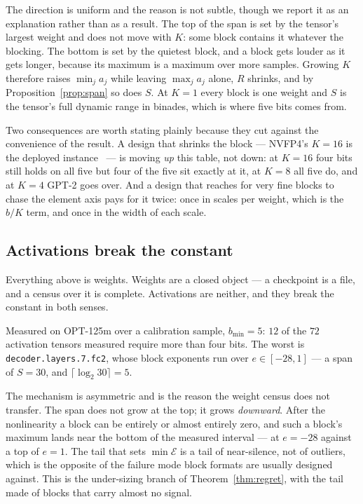 \documentclass[11pt]{article}
\theoremstyle{definition}
\begin{document}
The direction is uniform and the reason is not subtle, though we report it as an
explanation rather than as a result. The top of the span is set by the tensor's
largest weight and does not move with $K$: some block contains it whatever the
blocking. The bottom is set by the quietest block, and a block gets louder as it
gets longer, because its maximum is a maximum over more samples. Growing $K$
therefore raises $\min_j a_j$ while leaving $\max_j a_j$ alone, $R$ shrinks, and
by Proposition~\ref{prop:span} so does $S$. At $K=1$ every block is one weight
and $S$ is the tensor's full dynamic range in binades, which is where five bits
comes from.

Two consequences are worth stating plainly because they cut against the
convenience of the result. A design that shrinks the block --- NVFP4's $K=16$ is
the deployed instance~\cite{nvfp4} --- is moving \emph{up} this table, not down:
at $K=16$ four bits still holds on all five but four of the five sit exactly at
it, at $K=8$ all five do, and at $K=4$ GPT-2 goes over. And a design that reaches
for very fine blocks to chase the element axis pays for it twice: once in scales
per weight, which is the $b/K$ term, and once in the width of each scale.

\subsection{Activations break the constant}
\label{sec:widthact}

Everything above is weights. Weights are a closed object --- a checkpoint is a
file, and a census over it is complete. Activations are neither, and they break
the constant in both senses.

Measured on OPT-125m over a calibration sample, $b_{\min} = 5$: $12$ of the $72$
activation tensors measured require more than four bits. The worst is
\texttt{decoder.layers.7.fc2}, whose block exponents run over
$e \in [-28, 1]$ --- a span of $S = 30$, and $\lceil \log_2 30 \rceil = 5$.

The mechanism is asymmetric and is the reason the weight census does not
transfer. The span does not grow at the top; it grows \emph{downward}. After the
nonlinearity a block can be entirely or almost entirely zero, and such a block's
maximum lands near the bottom of the measured interval --- at $e = -28$ against
a top of $e = 1$. The tail that sets $\min\mathcal{E}$ is a tail of near-silence,
not of outliers, which is the opposite of the failure mode block formats are
usually designed against. This is the under-sizing branch of
Theorem~\ref{thm:regret}, with the tail made of blocks that carry almost no
signal.
\end{document}
